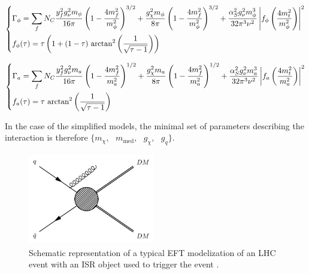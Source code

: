 \documentclass[a4paper, 10pt, openright]{report}
\begin{document}
\begin{itemize}
\begin{equation}
\label{eq:WidthMed}
\begin{dcases}
\Gamma_{\phi} = \sum_f N_C \frac{y_f^2 g_\nu^2 m_\phi}{16 \pi} \left (1- \frac{4 m_f^2}{m_\phi^2} \right )^{3/2} + \frac{g_\chi^2 m_\phi}{8 \pi} \left (1- \frac{4 m_f^2}{m_\phi^2} \right )^{3/2} + \frac{\alpha_S^2 g_\nu^2 m_\phi^3}{32 \pi^3 \nu^2} \left \lvert f_\phi \left (\frac{4m_t^2}{m_\phi^2} \right ) \right \rvert^2 \\
f_\phi(\tau) = \tau \left (1 + (1 - \tau) \text{ arctan}^2 \left ( \frac{1}{\sqrt{\tau -1}} \right ) \right )
\end{dcases}
\end{equation}

\begin{equation}
\label{eq:WidthMedPseudo}
\begin{dcases}
\Gamma_{a} = \sum_f N_C \frac{y_f^2 g_\nu^2 m_a}{16 \pi} \left (1- \frac{4 m_f^2}{m_a^2} \right )^{1/2} + \frac{g_\chi^2 m_a}{8 \pi} \left (1- \frac{4 m_f^2}{m_a^2} \right )^{1/2} + \frac{\alpha_S^2 g_\nu^2 m_a^3}{32 \pi^3 \nu^2} \left \lvert f_a \left (\frac{4m_t^2}{m_a^2} \right ) \right \rvert^2 \\
f_a(\tau)= \tau \text{ arctan}^2 \left (\frac{1}{\sqrt{\tau -1}} \right )
\end{dcases}
\end{equation}

In the case of the simplified models, the minimal set of parameters describing the interaction is therefore $\{m_\chi, \text{ } m_{\text{med}}, \text{ } g_\chi, \text{ } g_q \}$.

\begin{figure}[htbp]
\begin{center}
\includegraphics[width=5.5cm, height=4cm]{figs/EFT.png}
\caption{Schematic representation of a typical \ac{EFT} modelization of an \ac{LHC} event with an \ac{ISR} object used to trigger the event \cite{ColliderSearches}.}
\label{fig:EFT}
\end{center}
\end{figure}

\end{itemize}
\end{document}
